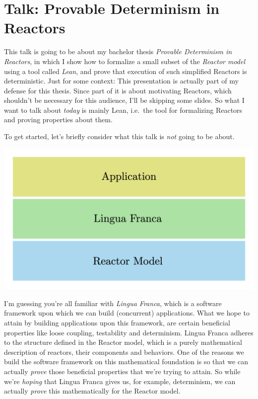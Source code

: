 \documentclass{article}
\begin{document}
\section*{Talk: Provable Determinism in Reactors}

This talk is going to be about my bachelor thesis \emph{Provable Determinism in Reactors}, in which I show how to formalize a small
subset of the \emph{Reactor model} using a tool called \emph{Lean}, and
prove that execution of such simplified Reactors is deterministic. Just
for some context: This presentation is actually part of my defense for
this thesis. Since part of it is about motivating Reactors, which
shouldn't be necessary for this audience, I'll be skipping some slides.
So what I want to talk about \emph{today} is mainly Lean, i.e.~the tool
for formalizing Reactors and proving properties about them.

To get started, let's briefly consider what this talk is \emph{not}
going to be about.

\begin{center}
\includegraphics[width=\columnwidth]{Slides/Slide 1.jpeg}
\end{center}

I'm guessing you're all familiar with \emph{Lingua Franca}, which is a
software framework upon which we can build (concurrent) applications.
What we hope to attain by building applications upon this framework, are
certain beneficial properties like loose coupling, testability and
determinism. Lingua Franca adheres to the structure defined in the
Reactor model, which is a purely mathematical description of reactors,
their components and behaviors. One of the reasons we build the software
framework on this mathematical foundation is so that we can actually
\emph{prove} those beneficial properties that we're trying to attain. So
while we're \emph{hoping} that Lingua Franca gives us, for example,
determinism, we can actually \emph{prove} this mathematically for the
Reactor model.
\end{document}
